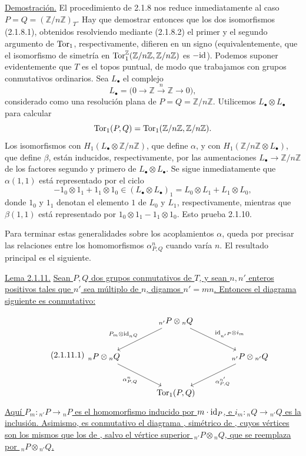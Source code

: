 \medskip
\noindent\underline{Demostración.}
El procedimiento de 2.1.8 nos reduce inmediatamente al caso
$P=Q=(\mathbb Z/n\mathbb Z)_T$. Hay que demostrar entonces que los
dos isomorfismos (2.1.8.1), obtenidos resolviendo mediante (2.1.8.2)
el primer y el segundo argumento de $\operatorname{Tor}_1$, respectivamente,
difieren en un signo (equivalentemente, que el isomorfismo de simetría
en $\operatorname{Tor}^{\mathbb Z}_1(\mathbb Z/n\mathbb Z,\mathbb Z/n\mathbb Z)$
es $-\mathrm{id}$). Podemos suponer evidentemente que $T$ es el topos puntual,
de modo que trabajamos con grupos conmutativos ordinarios. Sea
$L_\bullet$ el complejo
\[
 L_\bullet=\bigl(0\longrightarrow\mathbb Z
 \xrightarrow{n}\mathbb Z\longrightarrow0\bigr),
\]
considerado como una resolución plana de
$P=Q=\mathbb Z/n\mathbb Z$. Utilicemos
$L_\bullet\otimes L_\bullet$ para calcular
\[
 \operatorname{Tor}_1(P,Q)=\operatorname{Tor}_1(\mathbb Z/n\mathbb Z,\mathbb Z/n\mathbb Z).
\]
Los isomorfismos con
$H_1(L_\bullet\otimes\mathbb Z/n\mathbb Z)$, que define $\alpha$,
y con $H_1(\mathbb Z/n\mathbb Z\otimes L_\bullet)$, que define
$\beta$, están inducidos, respectivamente, por las aumentaciones
$L_\bullet\longrightarrow\mathbb Z/n\mathbb Z$ de los factores
segundo y primero de $L_\bullet\otimes L_\bullet$. Se sigue
inmediatamente que $\alpha(1,1)$ está representado por el ciclo
\[
 -1_0\otimes1_1+1_1\otimes1_0
 \in(L_\bullet\otimes L_\bullet)_1
 =L_0\otimes L_1+L_1\otimes L_0,
\]
donde $1_0$ y $1_1$ denotan el elemento $1$ de $L_0$ y $L_1$,
respectivamente, mientras que $\beta(1,1)$ está representado por
$1_0\otimes1_1-1_1\otimes1_0$. Esto prueba 2.1.10.

Para terminar estas generalidades sobre los acoplamientos $\alpha$,
queda por precisar las relaciones entre los homomorfismos
$\alpha^n_{P,Q}$ cuando varía $n$. El resultado principal es el
siguiente.

\medskip
\noindent\underline{Lema 2.1.11.}
\underline{Sean $P,Q$ dos grupos conmutativos de $T$, y sean $n,n'$
enteros positivos tales que $n'$ sea múltiplo de $n$, digamos
$n'=mn$. Entonces el diagrama siguiente es conmutativo:}


\begin{equation}\tag{2.1.11.1}
\begin{tikzcd}[column sep=large,row sep=large]
 &{}_{n'}P\otimes{}_nQ
   \arrow[ld,"P_m\otimes\id_{{}_nQ}"']
   \arrow[rd,"\id_{{}_{n'}P}\otimes i_m"]&\\
 {}_nP\otimes{}_nQ
   \arrow[rd,"{\alpha^n_{P,Q}}"']&&
 {}_{n'}P\otimes{}_{n'}Q
   \arrow[ld,"{\alpha^{n'}_{P,Q}}"]\\
 &\uTor_1(P,Q)&
\end{tikzcd}
\end{equation}
\underline{Aquí $P_m:{}_{n'}P\longrightarrow{}_nP$ es el
homomorfismo inducido por $m\cdot\mathrm{id}_P$, e
$i_m:{}_nQ\longrightarrow{}_{n'}Q$ es la inclusión. Asimismo, es
conmutativo el diagrama , simétrico de
, cuyos vértices son los mismos que los de
, salvo el vértice superior
$\,{}_{n'}P\otimes{}_nQ$, que se reemplaza por
$\,{}_nP\otimes{}_{n'}Q$.}

